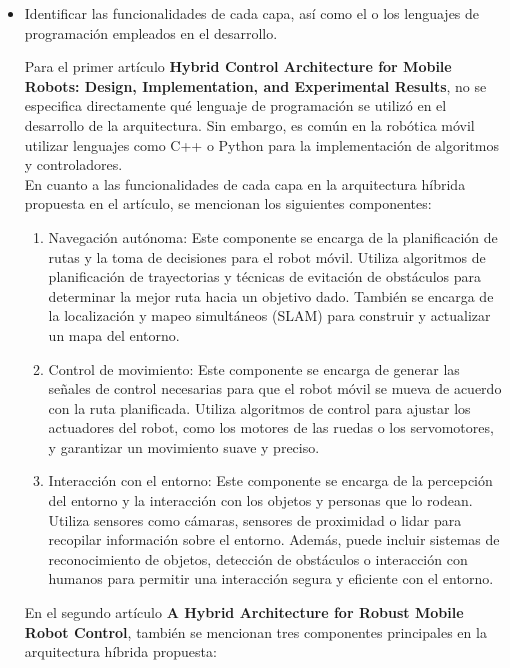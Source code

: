 \documentclass{article}
\begin{document}
\begin{itemize}
\item{Identificar las funcionalidades de cada capa, así como el o los lenguajes de programación empleados en el desarrollo.}

  Para el primer artículo \textbf{Hybrid Control Architecture for Mobile Robots: Design, Implementation, and Experimental Results}, no se especifica directamente qué lenguaje de programación se utilizó en el desarrollo de la arquitectura. Sin embargo, es común en la robótica móvil utilizar lenguajes como C++ o Python para la implementación de algoritmos y controladores.\\

  En cuanto a las funcionalidades de cada capa en la arquitectura híbrida propuesta en el artículo, se mencionan los siguientes componentes:\\

  \begin{enumerate}
  \item Navegación autónoma: Este componente se encarga de la planificación de rutas y la toma de decisiones para el robot móvil. Utiliza algoritmos de planificación de trayectorias y técnicas de evitación de obstáculos para determinar la mejor ruta hacia un objetivo dado. También se encarga de la localización y mapeo simultáneos (SLAM) para construir y actualizar un mapa del entorno.
  \item Control de movimiento: Este componente se encarga de generar las señales de control necesarias para que el robot móvil se mueva de acuerdo con la ruta planificada. Utiliza algoritmos de control para ajustar los actuadores del robot, como los motores de las ruedas o los servomotores, y garantizar un movimiento suave y preciso.
  \item Interacción con el entorno: Este componente se encarga de la percepción del entorno y la interacción con los objetos y personas que lo rodean. Utiliza sensores como cámaras, sensores de proximidad o lidar para recopilar información sobre el entorno. Además, puede incluir sistemas de reconocimiento de objetos, detección de obstáculos o interacción con humanos para permitir una interacción segura y eficiente con el entorno.
  \end{enumerate}

  En el segundo artículo \textbf{A Hybrid Architecture for Robust Mobile Robot Control}, también se mencionan tres componentes principales en la arquitectura híbrida propuesta:\\


\end{itemize}
\end{document}
